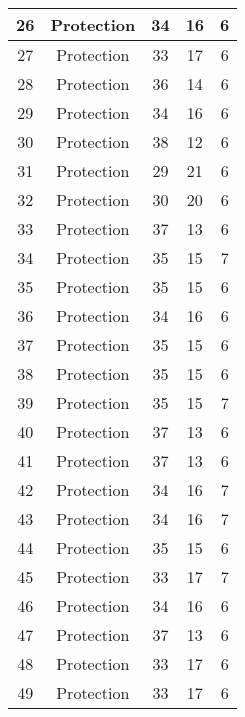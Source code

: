\documentclass[results.tex]{subfiles}
\begin{document}
\begin{center}
\begin{tabular}{| c || c | c | c | c |}
    \hline
    26 & Protection & 34 & 16 & 6 \\ 
    \hline
    27 & Protection & 33 & 17 & 6 \\ 
    \hline
    28 & Protection & 36 & 14 & 6 \\ 
    \hline
    29 & Protection & 34 & 16 & 6 \\ 
    \hline
    30 & Protection & 38 & 12 & 6 \\ 
    \hline
    31 & Protection & 29 & 21 & 6 \\ 
    \hline
    32 & Protection & 30 & 20 & 6 \\ 
    \hline
    33 & Protection & 37 & 13 & 6 \\ 
    \hline
    34 & Protection & 35 & 15 & 7 \\ 
    \hline
    35 & Protection & 35 & 15 & 6 \\ 
    \hline
    36 & Protection & 34 & 16 & 6 \\ 
    \hline
    37 & Protection & 35 & 15 & 6 \\ 
    \hline
    38 & Protection & 35 & 15 & 6 \\ 
    \hline
    39 & Protection & 35 & 15 & 7 \\ 
    \hline
    40 & Protection & 37 & 13 & 6 \\ 
    \hline
    41 & Protection & 37 & 13 & 6 \\ 
    \hline
    42 & Protection & 34 & 16 & 7 \\ 
    \hline
    43 & Protection & 34 & 16 & 7 \\ 
    \hline
    44 & Protection & 35 & 15 & 6 \\ 
    \hline
    45 & Protection & 33 & 17 & 7 \\ 
    \hline
    46 & Protection & 34 & 16 & 6 \\ 
    \hline
    47 & Protection & 37 & 13 & 6 \\ 
    \hline
    48 & Protection & 33 & 17 & 6 \\ 
    \hline
    49 & Protection & 33 & 17 & 6 \\ 
    \hline   \end{tabular}
\end{center}
\end{document}
